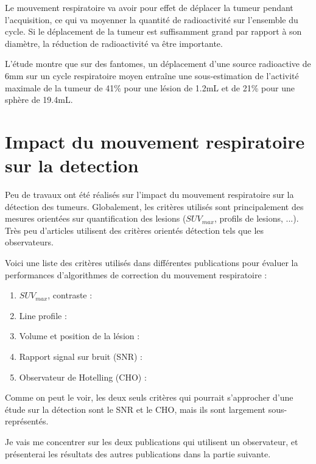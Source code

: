 Le mouvement respiratoire va avoir pour effet de déplacer la tumeur pendant l'acquisition, ce qui va moyenner la quantité de radioactivité sur l'ensemble du cycle. Si le déplacement de la tumeur est suffisamment grand par rapport à son diamètre, la réduction de radioactivité va être importante.

L'étude \cite{boucher2004respiratory} montre que sur des fantomes, un déplacement d'une source radioactive de 6mm sur un cycle respiratoire moyen entraîne une sous-estimation de l'activité maximale de la tumeur de 41\% pour une lésion de 1.2mL et de 21\% pour une sphère de 19.4mL.


\section{Impact du mouvement respiratoire sur la detection}

Peu de travaux ont été réalisés sur l'impact du mouvement respiratoire sur la détection des tumeurs. Globalement, les critères utilisés sont principalement des mesures orientées sur quantification des lesions ($SUV_{max}$, profils de lesions, ...). Très peu d'articles utilisent des critères orientés détection tels que les observateurs.

Voici une liste des critères utilisés dans différentes publications pour évaluer la performances d'algorithmes de correction du mouvement respiratoire :

\begin{enumerate}
 \item  $SUV_{max}$, contraste : \cite{GuopingChang2010Implementation} \cite{lamare2007list} \cite{nehmeh2002effect} \cite{detorie2008quantitative}
 \item Line profile : \cite{GuopingChang2010Implementation} \cite{Thielemans2006Lesion} \cite{lamare2007list}
 \item Volume et position de la lésion : \cite{GuopingChang2010Implementation} \cite{lamare2007list} \cite{nehmeh2002effect}
 \item Rapport signal sur bruit (SNR) : \cite{GuopingChang2010Implementation}
 \item Observateur de Hotelling (CHO) : \cite{Thielemans2006Lesion}
\end{enumerate}

Comme on peut le voir, les deux seuls critères qui pourrait s'approcher d'une étude sur la détection sont le SNR et le CHO, mais ils sont largement sous-représentés. 

Je vais me concentrer sur les deux publications qui utilisent un observateur, et présenterai les résultats des autres publications dans la partie suivante.

